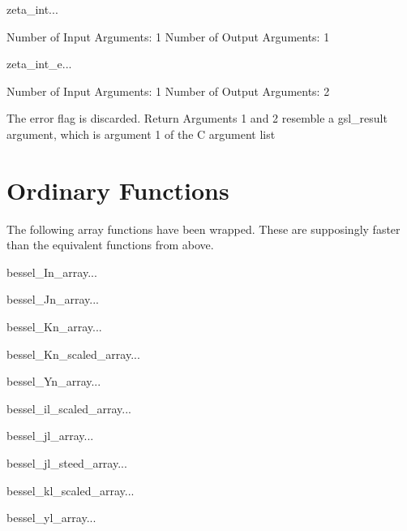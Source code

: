 \begin{funcdesc}{zeta_int}{...}

    Number of Input  Arguments:  1
    Number of Output Arguments:  1
\end{funcdesc}

\begin{funcdesc}{zeta_int_e}{...}

    Number of Input  Arguments:  1
    Number of Output Arguments:  2

The error flag is discarded.
Return Arguments 1 and 2 resemble a gsl_result argument,
	which is  argument 1 of the C argument list

\end{funcdesc}

\section{Ordinary Functions}

The following array functions have been wrapped. These are supposingly faster
than the equivalent functions from above.
\begin{funcdesc}{bessel_In_array}{...}
\end{funcdesc}
\begin{funcdesc}{bessel_Jn_array}{...}
\end{funcdesc}
\begin{funcdesc}{bessel_Kn_array}{...}
\end{funcdesc}
\begin{funcdesc}{bessel_Kn_scaled_array}{...}
\end{funcdesc}
\begin{funcdesc}{bessel_Yn_array}{...}
\end{funcdesc}
\begin{funcdesc}{bessel_il_scaled_array}{...}
\end{funcdesc}
\begin{funcdesc}{bessel_jl_array}{...}
\end{funcdesc}
\begin{funcdesc}{bessel_jl_steed_array}{...}
\end{funcdesc}
\begin{funcdesc}{bessel_kl_scaled_array}{...}
\end{funcdesc}
\begin{funcdesc}{bessel_yl_array}{...}
\end{funcdesc}
